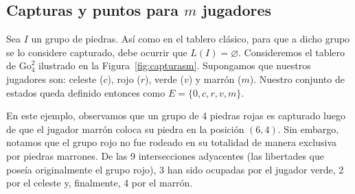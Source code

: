 \subsection{Capturas y puntos para \texorpdfstring{$m$}{m} jugadores}\label{capturas_n_jug}

Sea $I$ un grupo de piedras. Así como en el tablero clásico, para que a dicho grupo se lo considere capturado, debe ocurrir que $L(I)=\varnothing$. Consideremos el tablero de $\mathrm{Go}^{2}_{4}$ ilustrado en la Figura~\ref{fig:capturasm}. Supongamos que nuestros jugadores son: celeste ($c$), rojo ($r$), verde ($v$) y marrón ($m$). Nuestro conjunto de estados queda definido entonces como $E = \{0, c, r, v, m\}$.

En este ejemplo, observamos que un grupo de 4 piedras rojas es capturado luego de que el jugador marrón coloca su piedra en la posición $(6,4)$. Sin embargo, notamos que el grupo rojo no fue rodeado en su totalidad de manera exclusiva por piedras marrones. De las 9 intersecciones adyacentes (las libertades que poseía originalmente el grupo rojo), 3 han sido ocupadas por el jugador verde, 2 por el celeste y, finalmente, 4 por el marrón.

